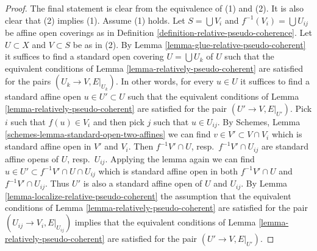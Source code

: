\documentclass[10pt,a4paper]{amsart}
\theoremstyle{plain}
\theoremstyle{definition}
\theoremstyle{remark}
\numberwithin{equation}{subsection}
\begin{document}
\begin{proof}
The final statement is clear from the equivalence of (1) and (2).
It is also clear that (2) implies (1). Assume (1) holds.
Let $S = \bigcup V_i$ and $f^{-1}(V_i) = \bigcup U_{ij}$ be
affine open coverings as in
Definition \ref{definition-relative-pseudo-coherence}.
Let $U \subset X$ and $V \subset S$ be as in (2).
By Lemma \ref{lemma-glue-relative-pseudo-coherent}
it suffices to find a standard open covering $U = \bigcup U_k$ of $U$
such that the equivalent conditions of
Lemma \ref{lemma-relatively-pseudo-coherent}
are satisfied for the pairs $(U_k \to V, E|_{U_k})$.
In other words, for every $u \in U$ it suffices
to find a standard affine open $u \in U' \subset U$ such that
the equivalent conditions of
Lemma \ref{lemma-relatively-pseudo-coherent}
are satisfied for the pair $(U' \to V, E|_{U'})$.
Pick $i$ such that $f(u) \in V_i$ and then pick $j$ such that
$u \in U_{ij}$. By
Schemes, Lemma \ref{schemes-lemma-standard-open-two-affines}
we can find $v \in V' \subset V \cap V_i$ which is standard affine
open in $V'$ and $V_i$. Then $f^{-1}V'  \cap U$, resp.\ $f^{-1}V' \cap U_{ij}$
are standard affine opens of $U$, resp.\ $U_{ij}$.
Applying the lemma again we can find
$u \in U' \subset f^{-1}V' \cap U \cap U_{ij}$ which is standard affine
open in both $f^{-1}V'  \cap U$ and $f^{-1}V' \cap U_{ij}$.
Thus $U'$ is also a standard affine open of $U$ and $U_{ij}$.
By Lemma \ref{lemma-localize-relative-pseudo-coherent}
the assumption that the equivalent conditions of
Lemma \ref{lemma-relatively-pseudo-coherent}
are satisfied for the pair $(U_{ij} \to V_i, E|_{U_{ij}})$
implies that the equivalent conditions of
Lemma \ref{lemma-relatively-pseudo-coherent}
are satisfied for the pair $(U' \to V, E|_{U'})$.
\end{proof}
\end{document}
